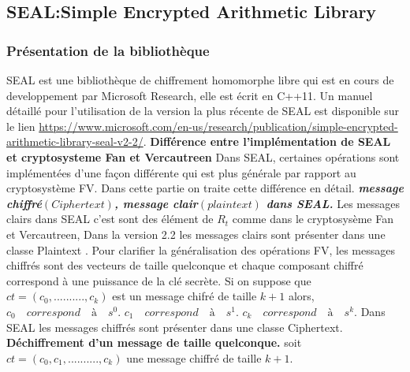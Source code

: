 \documentclass[a4paper,12pt]{article}
\begin{document}
\subsection{SEAL:Simple Encrypted Arithmetic Library}
\subsubsection{Présentation de la bibliothèque}
SEAL est une bibliothèque de chiffrement homomorphe libre qui est en cours de developpement par Microsoft Research, elle est écrit en C++11.
Un manuel détaillé pour l'utilisation de la version la plus récente de SEAL est disponible sur le lien \url{https://www.microsoft.com/en-us/research/publication/simple-encrypted-arithmetic-library-seal-v2-2/}. \newline
 \newline
\textbf{Différence entre l'implémentation de SEAL et cryptosysteme Fan et Vercautreen}  \newline
Dans SEAL, certaines opérations sont implémentées d'une façon différente qui est plus générale par rapport au cryptosystème FV.\newline
Dans cette partie on traite cette différence en détail.\newline
\textbf{\textit{message chiffré$(Ciphertext)$, message clair$(plaintext)$ dans SEAL.}}\newline
Les messages clairs dans SEAL c'est sont des élément de $R_t$ comme dans le cryptosysème Fan et Vercautreen,
Dans la version 2.2 les messages clairs sont présenter dans une classe Plaintext .\newline
Pour clarifier la généralisation des opérations FV, les messages chiffrés sont des vecteurs de taille quelconque et chaque composant chiffré correspond à une puissance de la clé secrète. Si on suppose que $ct = (c_0,..........,c_k)$ est un message chifré de taille $k+1$ alors,\newline
$c_0\quad correspond \quad à \quad s^0.$\newline
$c_1\quad correspond \quad à \quad s^1.$\newline
$c_k\quad correspond \quad à \quad s^k.$
\newline
 Dans SEAL les messages chiffrés sont présenter dans une classe Ciphertext.\newline
 \newline
 \textbf{Déchiffrement d'un message de taille quelconque.}\newline
soit $ct = (c_0, c_1, .........., c_k)$ une message chiffré de taille $k+1.$\newline
\end{document}
